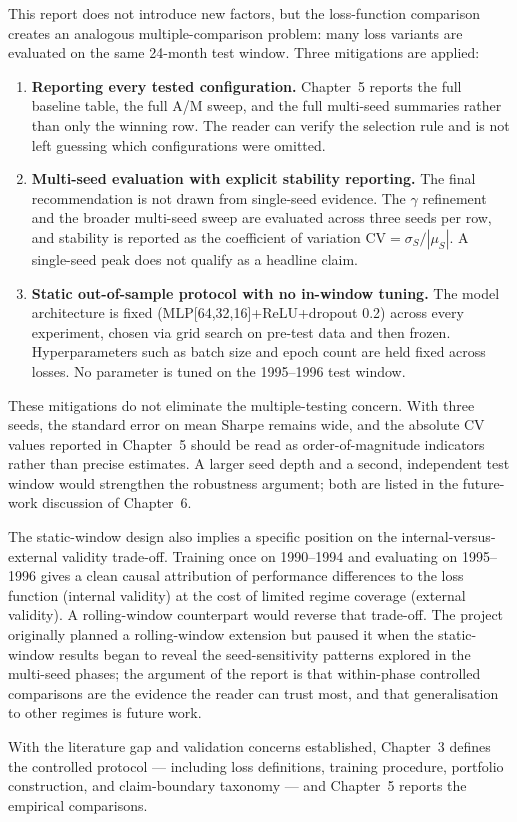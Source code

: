 This report does not introduce new factors, but the loss-function comparison creates an analogous multiple-comparison problem: many loss variants are evaluated on the same 24-month test window. Three mitigations are applied:

\begin{enumerate}
 \item \textbf{Reporting every tested configuration.} Chapter~5 reports the full baseline table, the full A/M sweep, and the full multi-seed summaries rather than only the winning row. The reader can verify the selection rule and is not left guessing which configurations were omitted.
 \item \textbf{Multi-seed evaluation with explicit stability reporting.} The final recommendation is not drawn from single-seed evidence. The $\gamma$ refinement and the broader multi-seed sweep are evaluated across three seeds per row, and stability is reported as the coefficient of variation $\mathrm{CV} = \sigma_S / |\mu_S|$. A single-seed peak does not qualify as a headline claim.
 \item \textbf{Static out-of-sample protocol with no in-window tuning.} The model architecture is fixed (MLP[64,32,16]+ReLU+dropout 0.2) across every experiment, chosen via grid search on pre-test data and then frozen. Hyperparameters such as batch size and epoch count are held fixed across losses. No parameter is tuned on the 1995--1996 test window.
\end{enumerate}

These mitigations do not eliminate the multiple-testing concern. With three seeds, the standard error on mean Sharpe remains wide, and the absolute CV values reported in Chapter~5 should be read as order-of-magnitude indicators rather than precise estimates. A larger seed depth and a second, independent test window would strengthen the robustness argument; both are listed in the future-work discussion of Chapter~6.

The static-window design also implies a specific position on the internal-versus-external validity trade-off. Training once on 1990--1994 and evaluating on 1995--1996 gives a clean causal attribution of performance differences to the loss function (internal validity) at the cost of limited regime coverage (external validity). A rolling-window counterpart would reverse that trade-off. The project originally planned a rolling-window extension but paused it when the static-window results began to reveal the seed-sensitivity patterns explored in the multi-seed phases; the argument of the report is that within-phase controlled comparisons are the evidence the reader can trust most, and that generalisation to other regimes is future work.

With the literature gap and validation concerns established, Chapter~3 defines the controlled protocol --- including loss definitions, training procedure, portfolio construction, and claim-boundary taxonomy --- and Chapter~5 reports the empirical comparisons.
